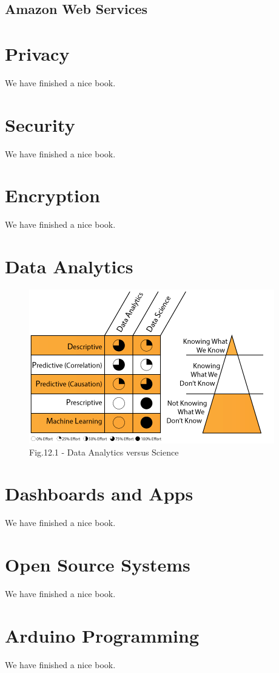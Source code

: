 \documentclass[]{book}
\theoremstyle{definition}
\theoremstyle{definition}
\theoremstyle{remark}
\begin{document}
\section{Amazon Web Services}\label{amazon-web-services}

\chapter{Privacy}\label{privacy}

We have finished a nice book.

\chapter{Security}\label{security}

We have finished a nice book.

\chapter{Encryption}\label{encryption}

We have finished a nice book.

\hypertarget{analytics}{\chapter{Data Analytics}\label{analytics}}

\begin{figure}[htbp]
\centering
\includegraphics{./images/datascience.png}
\caption{Fig.12.1 - Data Analytics versus Science}
\end{figure}

\citep{j_data_2013}

\chapter{Dashboards and Apps}\label{apps}

We have finished a nice book.

\chapter{Open Source Systems}\label{opensource}

We have finished a nice book.

\chapter{Arduino Programming}\label{arduino}

We have finished a nice book.


\end{document}
